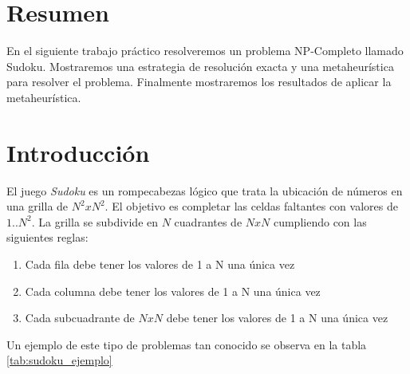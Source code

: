 \documentclass[a4paper,spanish]{article}
\begin{document}


\tableofcontents
\pagebreak

\section{Resumen}
En el siguiente trabajo práctico resolveremos un problema NP-Completo llamado
Sudoku. Mostraremos una estrategia de resolución exacta y una metaheurística
para resolver el problema. Finalmente mostraremos los resultados de aplicar la
metaheurística.


\section{Introducción}
\label{sec:intro}

El juego \emph{Sudoku} es un rompecabezas lógico que trata la ubicación de
números en una grilla de $N^2 x N^2$. El objetivo es completar las celdas
faltantes con valores de $1..N^2$. La grilla se subdivide en $N$ cuadrantes de
$N x N$  cumpliendo con las siguientes reglas:

\begin{enumerate}
        \label{enum:principios}

    \item Cada fila debe tener los valores de 1 a N una única vez
    \item Cada columna debe tener los valores de 1 a N una única vez
    \item Cada subcuadrante de $NxN$ debe tener los valores de 1 a N una única vez
\end{enumerate}

Un ejemplo de este tipo de problemas tan conocido se observa en la tabla
\ref{tab:sudoku_ejemplo}
\end{document}
